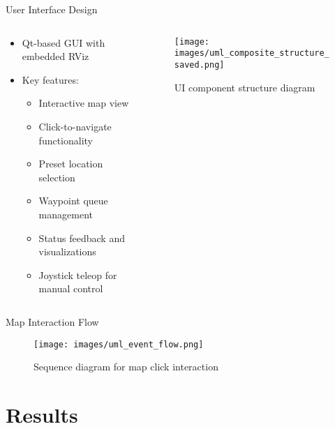 \documentclass[aspectratio=169]{beamer}
\begin{document}
\begin{frame}{User Interface Design}
	\begin{columns}
		\begin{column}{0.5\textwidth}
			\begin{itemize}
				\item Qt-based GUI with embedded RViz
				\item Key features:
				      \begin{itemize}
					      \item Interactive map view
					      \item Click-to-navigate functionality
					      \item Preset location selection
					      \item Waypoint queue management
					      \item Status feedback and visualizations
					      \item Joystick teleop for manual control
				      \end{itemize}
			\end{itemize}
		\end{column}
		\begin{column}{0.5\textwidth}
			\begin{figure}
				\texttt{[image: images/uml\_composite\_structure\_saved.png]}
				\caption{UI component structure diagram}
			\end{figure}
		\end{column}
	\end{columns}
\end{frame}

\begin{frame}{Map Interaction Flow}
	\begin{figure}
		\centering
		\texttt{[image: images/uml\_event\_flow.png]}
		\caption{Sequence diagram for map click interaction}
	\end{figure}
\end{frame}

\section{Results}
\end{document}
